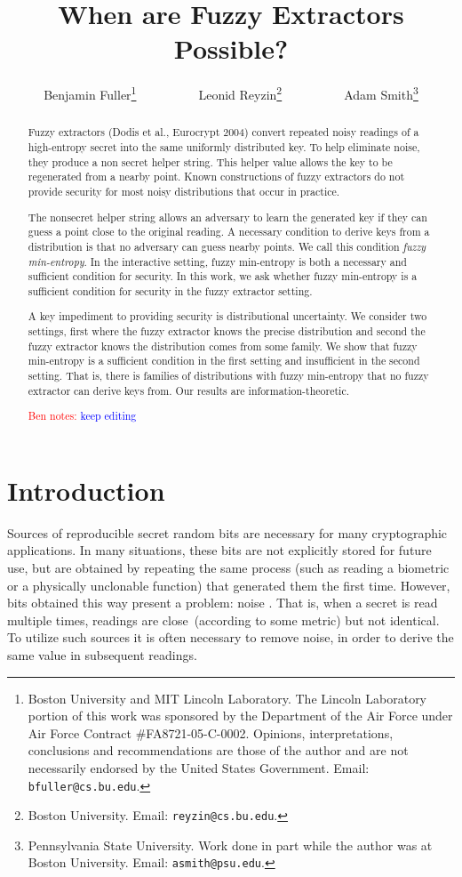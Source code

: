 \documentclass[11pt]{article}
\title{When are Fuzzy Extractors Possible?}
\author{Benjamin Fuller\footnote{Boston University and MIT Lincoln Laboratory. 
The Lincoln Laboratory portion of this work was sponsored by the Department of the Air Force under Air Force Contract \#FA8721-05-C-0002.  Opinions, interpretations, conclusions and recommendations are those of the author and are not necessarily endorsed by the United States Government.  
Email: {\tt bfuller@cs.bu.edu}.}~~~~~~~~~~Leonid Reyzin\footnote{Boston University.  Email: {\tt reyzin@cs.bu.edu}.}~~~~~~~~~~Adam Smith\footnote{Pennsylvania State University. Work done in part while the author was at Boston University.  Email: {\tt asmith@psu.edu}.  }}
\newcommand{\authnote}[2]{{\textcolor{red}{\textsf{#1 notes: }\textcolor{blue}{ #2}}\marginpar{\textcolor{red}{\textbf{!!!!!}}}}}
\newcommand{\authnote}[2]{}
\newcommand{\bnote}[1]{{\authnote{Ben}{#1}}}
\begin{document}
\maketitle

\begin{abstract}
Fuzzy extractors (Dodis et al., Eurocrypt 2004) convert repeated noisy readings of a high-entropy secret into the same uniformly distributed key. To help eliminate noise, they produce a non secret helper string. This helper value allows the key to be regenerated from a nearby point.  Known constructions of fuzzy extractors do not provide security for most noisy distributions that occur in practice.

The nonsecret helper string allows an adversary to learn the generated key if they can guess a point close to the original reading.  A necessary condition to derive keys from a distribution is that no adversary can guess nearby points.  We call this condition \emph{fuzzy min-entropy}.  In the interactive setting, fuzzy min-entropy is both a necessary and sufficient condition for security.  In this work, we ask whether fuzzy min-entropy is a sufficient condition for security in the fuzzy extractor setting.

A key impediment to providing security is distributional uncertainty.  We consider two settings, first where the fuzzy extractor knows the precise distribution and second the fuzzy extractor knows the distribution comes from some family.  We show that fuzzy min-entropy is a sufficient condition in the first setting and insufficient in the second setting.  That is, there is families of distributions with fuzzy min-entropy that no fuzzy extractor can derive keys from.  Our results are information-theoretic.


\bnote{keep editing}
\end{abstract}

\newpage
\tableofcontents\newpage

\section{Introduction}
Sources of reproducible secret random bits are necessary for many cryptographic applications.  In many situations, these bits are not explicitly stored for future use, but are obtained by repeating the same process  (such as reading a biometric or a physically unclonable function) that generated them the first time.
However, bits obtained this way present a problem: noise \cite{daugman2004,zviran1993comparison,brostoff2000passfaces,ellison2000protecting,mayrhofer2009shake,monrose2002password,pappu2002physical,tuyls2006puf,gassend2002silicon,suh2007physical,bennett1988privacy}.  That is, when a secret is read multiple times, readings are close~(according to some metric) but not identical.  To utilize such sources it is often necessary to remove noise, in order to derive the same value in subsequent readings.
\end{document}
